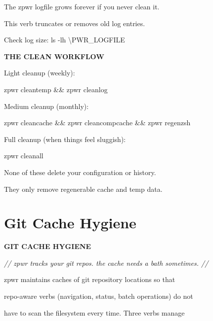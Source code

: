 \documentclass[11pt,a4paper,twoside]{book}
\begin{document}
The zpwr logfile grows forever if you never clean it.

This verb truncates or removes old log entries.

Check log size: ls -lh \textbackslash{}PWR\_LOGFILE


\vspace{12pt}
{\bfseries\color{neonyellow} THE CLEAN WORKFLOW}\vspace{4pt}

Light cleanup (weekly):

\begin{codebox}
zpwr cleantemp \&\& zpwr cleanlog\\
\end{codebox}

Medium cleanup (monthly):

\begin{codebox}
zpwr cleancache \&\& zpwr cleancompcache \&\& zpwr regenzsh\\
\end{codebox}

Full cleanup (when things feel sluggish):

\begin{codebox}
zpwr cleanall\\
\end{codebox}

None of these delete your configuration or history.

They only remove regenerable cache and temp data.


\vspace{16pt}

\section{Git Cache Hygiene}


\vspace{10pt}
{\large\bfseries\color{neoncyan} GIT CACHE HYGIENE}\vspace{6pt}

{\small\itshape\color{dimtext} // zpwr tracks your git repos. the cache needs a bath sometimes. //}

\begin{codebox}
zpwr maintains caches of git repository locations so that\\
\end{codebox}

repo-aware verbs (navigation, status, batch operations) do not

have to scan the filesystem every time. Three verbs manage
\end{document}
